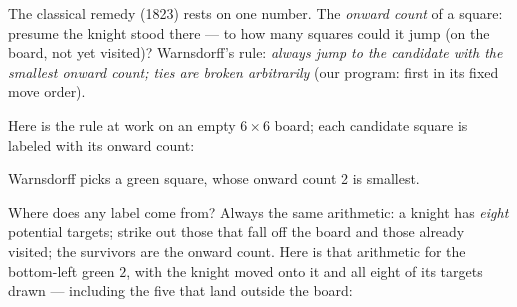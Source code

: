 \documentclass[11pt]{article}
\begin{document}
The classical remedy (1823) rests on one number. The \emph{onward count}
of a square: presume the knight stood there --- to how many squares could
it jump (on the board, not yet visited)? Warnsdorff's rule: \emph{always
jump to the candidate with the smallest onward count; ties are broken
arbitrarily} (our program: first in its fixed move order).

Here is the rule at work on an empty $6 \times 6$ board; each candidate
square is labeled with its onward count:

\begin{center}

\smallskip
Warnsdorff picks a green square, whose onward count 2 is smallest.
\end{center}

Where does any label come from? Always the same arithmetic: a knight has
\emph{eight} potential targets; strike out those that fall off the board
and those already visited; the survivors are the onward count. Here is
that arithmetic for the bottom-left green $2$, with the knight moved onto
it and all eight of its targets drawn --- including the five that land
outside the board:
\end{document}
